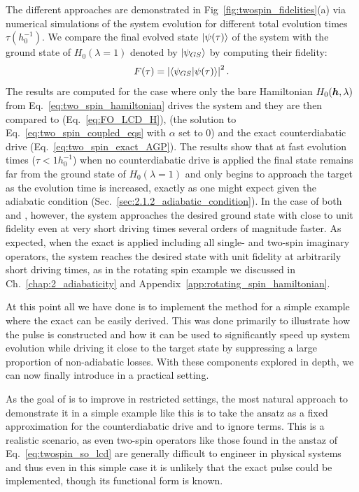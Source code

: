 The different approaches are demonstrated in Fig~\ref{fig:twospin_fidelities}(a) via numerical simulations of the system evolution for different total evolution times $\tau (h_0^{-1})$. We compare the final evolved state $\ket{\psi(\tau)}$ of the system with the ground state of $H_0(\lambda = 1)$ denoted by $\ket{\psi_{GS}}$ by computing their fidelity:
\begin{equation}
    F(\tau) = \left|\braket{\psi_{GS}}{\psi(\tau)}\right|^2.
\end{equation}
The results are computed for the case where only the bare Hamiltonian $H_0(\boldsymbol{h}, \lambda)$ from Eq.~\ref{eq:two_spin_hamiltonian} drives the system and they are then compared to   (Eq.~\eqref{eq:FO_LCD_H}),   (the solution to Eq.~\eqref{eq:two_spin_coupled_eqs} with $\alpha$ set to $0$) and the exact counterdiabatic drive (Eq.~\eqref{eq:two_spin_exact_AGP}). The results show that at fast evolution times ($\tau < 1 h_0^{-1}$) when no counterdiabatic drive is applied the final state remains far from the ground state of $H_0(\lambda = 1)$ and only begins to approach the target as the evolution time is increased, exactly as one might expect given the adiabatic condition (Sec.~\ref{sec:2.1.2_adiabatic_condition}). In the case of both  and  , however, the system approaches the desired ground state with close to unit fidelity even at very short driving times several orders of magnitude faster. As expected, when the exact  is applied including all single- and two-spin imaginary operators, the system reaches the desired state with unit fidelity at arbitrarily short driving times, as in the rotating spin example we discussed in Ch.~\ref{chap:2_adiabaticity} and Appendix~\ref{app:rotating_spin_hamiltonian}.

At this point all we have done is to implement the  method for a simple example where the exact  can be easily derived. This was done primarily to illustrate how the  pulse is constructed and how it can be used to significantly speed up system evolution while driving it close to the target state by suppressing a large proportion of non-adiabatic losses. With these components explored in depth, we can now finally introduce  in a practical setting.

As the goal of  is to improve  in restricted settings, the most natural approach to demonstrate it in a simple example like this is to take the   ansatz as a fixed approximation for the counterdiabatic drive and to ignore  terms. This is a realistic scenario, as even two-spin operators like those found in the   anstaz of Eq.~\eqref{eq:twospin_so_lcd} are generally difficult to engineer in physical systems and thus even in this simple case it is unlikely that the exact  pulse could be implemented, though its functional form is known.

